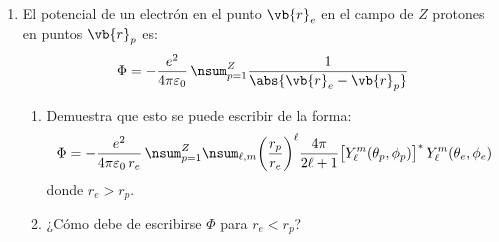 \begin{enumerate}
\item El potencial de un electrón en el punto $\vb{r}_{e}$ en el campo de $Z$ protones en puntos $\vb{r}_{p}$ es:
\begin{align*}
\Phi = - \dfrac{e^{2}}{4 \pi \varepsilon_{0}} \, \nsum_{p=1}^{Z} \dfrac{1}{\abs{\vb{r}_{e} - \vb{r}_{p}}}
\end{align*}
\begin{enumerate}[label=\roman*)]
\item Demuestra que esto se puede escribir de la forma:
\begin{align*}
\Phi = - \dfrac{e^{2}}{4 \pi \varepsilon_{0} \, r_{e}} \, \nsum_{p=1}^{Z} \nsum_{\ell, m} \bigg( \dfrac{r_{p}}{r_{e}} \bigg)^{\ell} \dfrac{4 \pi}{2 \ell + 1} \big[ Y_{\ell}^{m} (\theta_{p}, \phi_{p}) \big]^{*} \, Y_{\ell}^{m} (\theta_{e}, \phi_{e})
\end{align*}
donde $r_{e} > r_{p}$.
\item ¿Cómo debe de escribirse $\Phi$ para $r_{e} < r_{p}$?
\end{enumerate}

\end{enumerate}


